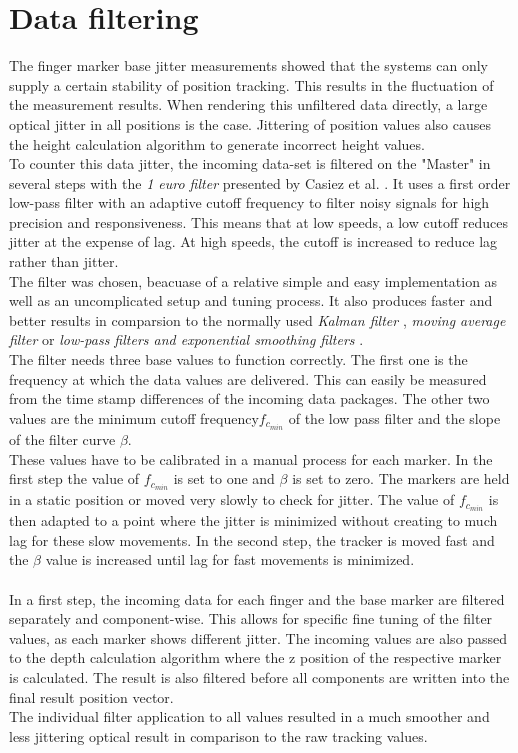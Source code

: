 \section{Data filtering}
The finger marker base jitter measurements showed that the systems can only supply a certain stability of position tracking. This results in the fluctuation of the measurement results. When rendering this unfiltered data directly, a large optical jitter in all positions is the case. Jittering of position values also causes the height calculation algorithm to generate incorrect height values.\\
To counter this data jitter, the incoming data-set is filtered on the "Master" in several steps with the \textit{1 euro filter} presented by Casiez et al. \cite{Casiez.2012}. It uses a first order low-pass filter with an adaptive cutoff frequency to filter noisy signals for high precision and responsiveness. This means that at low speeds, a low cutoff reduces jitter at the expense of lag. At high speeds, the cutoff is increased to reduce lag rather than jitter.\\
The filter was chosen, beacuase of a relative simple and easy implementation as well as an uncomplicated setup and tuning process. It also produces faster and better results in comparsion to the normally used \textit{Kalman filter} \cite{Welch.2001}, \textit{moving average filter} or \textit{low-pass filters and exponential smoothing filters} \cite{LaViola.2003}.\\ The filter needs three base values to function correctly. The first one is the frequency at which the data values are delivered. This can easily be measured from the time stamp differences of the incoming data packages. The other two values are the minimum cutoff frequency$f_{c_{min}} $ of the low pass filter and the slope of the filter curve $\beta$.
\\These values have to be calibrated in a manual process for each marker. In the first step the value of $f_{c_{min}} $ is set to one and $\beta$ is set to zero. The markers are held in a static position or moved very slowly to check for jitter. The value of $f_{c_{min}} $ is then adapted to a point where the jitter is minimized without creating to much lag for these slow movements. In the second step, the tracker is moved fast and the $\beta$ value is increased until lag for fast movements is minimized.
\\\\ In a first step, the incoming data for each finger and the base marker are filtered separately and component-wise. This allows for specific fine tuning of the filter values, as each marker shows different jitter. The incoming values are also passed to the depth calculation algorithm where the z position of the respective marker is calculated. The result is also filtered before all components are written into the final result position vector.\\
The individual filter application to all values resulted in a much smoother and less jittering optical result in comparison to the raw tracking values.
\newpage
